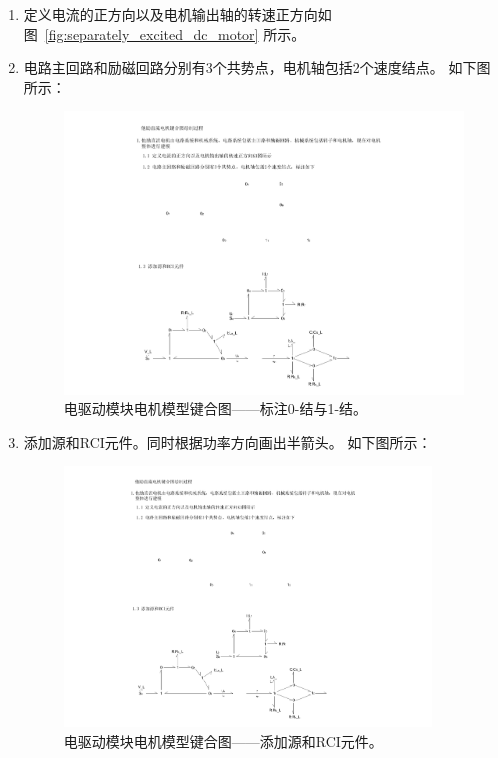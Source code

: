 \begin{enumerate}
	\item 定义电流的正方向以及电机输出轴的转速正方向如图~\ref{fig:separately_excited_dc_motor} 所示。
	
	\item 电路主回路和励磁回路分别有3个共势点，电机轴包括2个速度结点。
	如下图所示：
	\begin{figure}[!h]
		\centering
		\includegraphics[width=1.05\textwidth]{fig/4_1_bond.pdf}
		\caption{电驱动模块电机模型键合图——标注0-结与1-结。}\label{fig:4_1_bond}
	\end{figure}
	
	\clearpage
	
	\item 添加源和RCI元件。同时根据功率方向画出半箭头。
	如下图所示：
	\begin{figure}[!h]
		\centering
		\includegraphics[width=0.92\textwidth]{fig/4_2_bond.pdf}
		\caption{电驱动模块电机模型键合图——添加源和RCI元件。}\label{fig:4_2_bond}
	\end{figure}
	

\end{enumerate}

